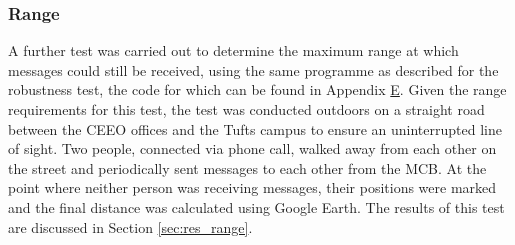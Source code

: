 \subsubsection{\label{sec:methods_test_range}Range}
A further test was carried out to determine the maximum range at which messages could still be received, using the same programme as described for the robustness test, the code for which can be found in Appendix \hyperref[chap:apx_e]{E}. Given the range requirements for this test, the test was conducted outdoors on a straight road between the CEEO offices and the Tufts campus to ensure an uninterrupted line of sight. 
Two people, connected via phone call, walked away from each other on the street and periodically sent messages to each other from the MCB. At the point where neither person was receiving messages, their positions were marked and the final distance was calculated using Google Earth. The results of this test are discussed in Section \ref{sec:res_range}.

